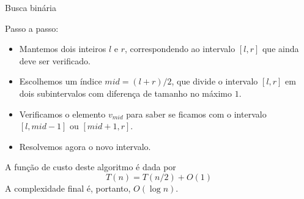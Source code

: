 \begin{frame}{Busca binária}

    Passo a passo: \pause
    \begin{itemize}
        \item Mantemos dois inteiros $l$ e $r$, correspondendo ao intervalo $[l, r]$ que ainda deve ser verificado. \pause
        \item Escolhemos um índice $mid = (l+r)/2$, que divide o intervalo $[l, r]$ em dois subintervalos com diferença de tamanho no máximo $1$. \pause
        \item Verificamos o elemento $v_{mid}$ para saber se ficamos com o intervalo $[l, mid-1]$ ou $[mid+1, r]$. \pause
        \item Resolvemos agora o novo intervalo.
    \end{itemize} \pause
    
    A função de custo deste algoritmo é dada por
        \[ T(n) = T(n/2) + O(1) \]
    A complexidade final é, portanto, \pause $O(\log n)$.

\end{frame}
